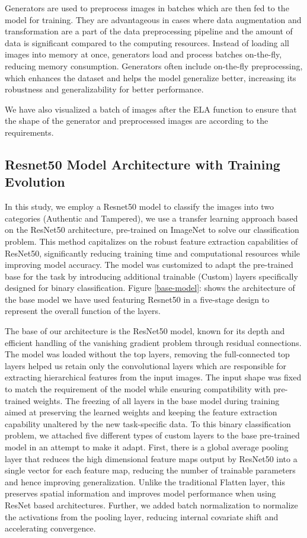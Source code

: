 \documentclass{ieeeaccess}
\begin{document}
Generators are used to preprocess images in batches which are then fed to the model for training. They are advantageous in cases where data augmentation and transformation are a part of the data preprocessing pipeline and the amount of data is significant compared to the computing resources. Instead of loading all images into memory at once, generators load and process batches on-the-fly, reducing memory consumption. Generators often include on-the-fly preprocessing, which enhances the dataset and helps the model generalize better, increasing its robustness and generalizability for better performance.

We have also visualized a batch of images after the ELA function to ensure that the shape of the generator and preprocessed images are according to the requirements.

\subsection{Resnet50 Model Architecture with Training Evolution }
In this study, we employ a Resnet50 model to classify the images into two categories (Authentic and Tampered), we use a transfer learning approach based on the ResNet50 architecture, pre-trained on ImageNet to solve our classification problem. This method capitalizes on the robust feature extraction capabilities of ResNet50, significantly reducing training time and computational resources while improving model accuracy. The model was customized to adapt the pre-trained base for the task by introducing additional trainable (Custom) layers specifically designed for binary classification. Figure \ref{base-model}: shows the architecture of the base model we have used featuring Resnet50 in a five-stage design to represent the overall function of the layers.

The base of our architecture is the ResNet50 model, known for its depth and efficient handling of the vanishing gradient problem through residual connections. The model was loaded without the top layers, removing the full-connected top layers helped us retain only the convolutional layers which are responsible for extracting hierarchical features from the input images. The input shape was fixed to match the requirement of the model while ensuring compatibility with pre-trained weights. The freezing of all layers in the base model during training aimed at preserving the learned weights and keeping the feature extraction capability unaltered by the new task-specific data. To this binary classification problem, we attached five different types of custom layers to the base pre-trained model in an attempt to make it adapt. First, there is a global average pooling layer that reduces the high dimensional feature maps output by ResNet50 into a single vector for each feature map, reducing the number of trainable parameters and hence improving generalization. Unlike the traditional Flatten layer, this preserves spatial information and improves model performance when using ResNet based architectures. Further, we added batch normalization to normalize the activations from the pooling layer, reducing internal covariate shift and accelerating convergence. 
\end{document}
